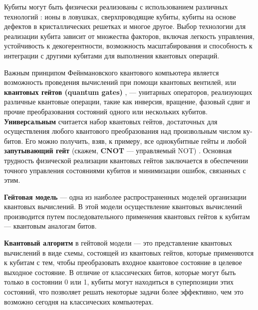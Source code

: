 Кубиты могут быть физически реализованы с использованием различных технологий \cite{valiev_1,nielsen_chuang,stean}: ионы в ловушках, сверхпроводящие кубиты, кубиты на основе дефектов в кристаллических решетках и многое другое. Выбор технологии для реа­лизации кубита зависит от множества факторов, включая легкость управления, устойчивость к декогерентности, возможность масштабирования и способность к интеграции с другими кубитами для выполнения квантовых операций.

Важным принципом Фейнмановского квантового компьютера является возможность проведения вычислений при помощи квантовых вентилей, или \textbf{квантовых гейтов (quantum gates)} \cite{valiev_1,valiev_2}, --- унитарных операторов, ре­ализующих различные квантовые операции, такие как инверсия, вращение, фазовый сдвиг и прочие преобразования состояний одного или нескольких ку­битов. \textbf{Универсальным} считается набор квантовых гейтов, достаточных для осуществления любого квантового преобразования над произвольным числом ку­битов. Его можно получить, взяв, к примеру, все однокубитные гейты и любой \textbf{запутывающий гейт} (скажем, \textbf{CNOT} --- управляемый NOT) \cite{quantum_gates_barenco}. Основная трудность физической реализации квантовых гейтов заключается в обеспече­нии точного управления состояниями кубитов и минимизации ошибок, связанных с этим.

\textbf{Гейтовая модель} --- одна из наиболее распространенных моделей организации квантовых вычислений. В этой модели осуществление квантовых вычислений производится путем последовательного применения кван­товых гейтов к кубитам --- квантовым аналогам битов. 

\textbf{Квантовый алгоритм} в гейтовой модели --- это представление кван­товых вычислений в виде схемы, состоящей из квантовых гейтов, которые применяются к кубитам с тем, чтобы преобразовать входное квантовое состоя­ние в целевое выходное состояние. В отличие от классических битов, которые могут быть только в состоянии 0 или 1, кубиты могут находиться в суперпозиции этих состояний, что позволяет решать некоторые задачи более эффективно, чем это возможно сегодня на классических компьютерах.

\begin{figure}[h!]
	\noindent{}
\end{figure}

